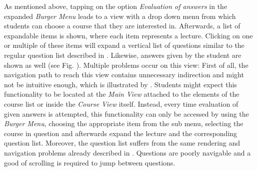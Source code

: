 As mentioned above, tapping on the option \emph{Evaluation of answers} in the expanded \emph{Burger Menu} leads to a view with a drop down menu from which students can choose a course that they are interested in. Afterwards, a list of expandable items is shown, where each item represents a lecture. Clicking on one or multiple of these items will expand a vertical list of questions similar to the regular question list described in . Likewise, answers given by the student are shown as well (see Fig. \todogrf).
Multiple problems occur on this view: First of all, the navigation path to reach this view contains unnecessary indirection and might not be intuitive enough, which is illustrated by . Students might expect this functionality to be located at the \emph{Main View} attached to the elements of the course list or inside the \emph{Course View} itself. Instead, every time evaluation of given answers is attempted, this functionality can only be accessed by using the \emph{Burger Menu}, choosing the appropriate item from the sub menu, selecting the course in question and afterwards expand the lecture and the corresponding question list.
Moreover, the question list suffers from the same rendering and navigation problems already described in . Questions are poorly navigable and a good of scrolling is required to jump between questions.


